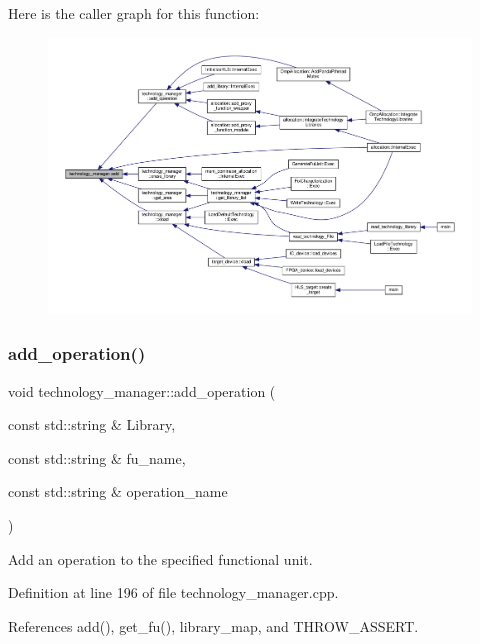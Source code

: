 Here is the caller graph for this function\+:
\nopagebreak
\begin{figure}[H]
\begin{center}
\leavevmode
\includegraphics[width=350pt]{df/dc7/classtechnology__manager_aab46c03c87a27bec53894e1d3ae9b97b_icgraph}
\end{center}
\end{figure}
\mbox{\label{classtechnology__manager_a2a5555fe0295bf0881902f5fd2730c0b}} 
\subsubsection{\texorpdfstring{add\+\_\+operation()}{add\_operation()}}
{\footnotesize\ttfamily void technology\+\_\+manager\+::add\+\_\+operation (\begin{DoxyParamCaption}\item[{const std\+::string \&}]{Library,  }\item[{const std\+::string \&}]{fu\+\_\+name,  }\item[{const std\+::string \&}]{operation\+\_\+name }\end{DoxyParamCaption})}



Add an operation to the specified functional unit. 



Definition at line 196 of file technology\+\_\+manager.\+cpp.



References add(), get\+\_\+fu(), library\+\_\+map, and T\+H\+R\+O\+W\+\_\+\+A\+S\+S\+E\+RT.



